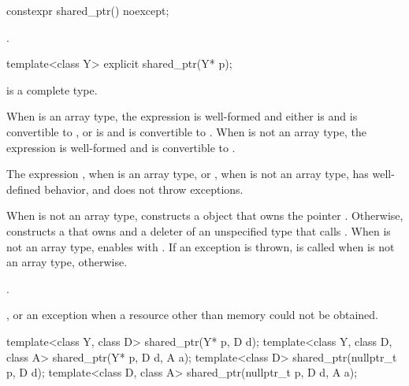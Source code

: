 %
\begin{itemdecl}
constexpr shared_ptr() noexcept;
\end{itemdecl}

\begin{itemdescr}
\pnum
\ensures
{}.
\end{itemdescr}

%
\begin{itemdecl}
template<class Y> explicit shared_ptr(Y* p);
\end{itemdecl}

\begin{itemdescr}
\pnum
\mandates
{} is a complete type.

\pnum
\constraints
When  is an array type,
the expression  is well-formed and either
 is  and  is convertible to , or
 is  and  is convertible to .
When  is not an array type,
the expression  is well-formed and
 is convertible to .

\pnum
\expects
The expression
, when  is an array type, or
, when  is not an array type,
has well-defined behavior, and
does not throw exceptions.

\pnum
\effects
When  is not an array type,
constructs a  object
that owns the pointer .
Otherwise, constructs a 
that owns  and a deleter of an
unspecified type that calls .
When  is not an array type,
enables  with .
If an exception is thrown,  is called
when  is not an array type,  otherwise.

\pnum
\ensures
{}.

\pnum
\throws
{}, or an  exception when a resource other than memory could not be obtained.
\end{itemdescr}

%
\begin{itemdecl}
template<class Y, class D> shared_ptr(Y* p, D d);
template<class Y, class D, class A> shared_ptr(Y* p, D d, A a);
template<class D> shared_ptr(nullptr_t p, D d);
template<class D, class A> shared_ptr(nullptr_t p, D d, A a);
\end{itemdecl}


